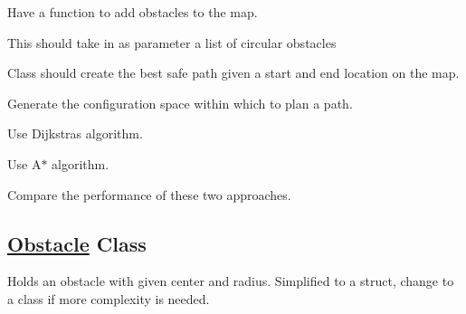 Have a function to add obstacles to the map.
\begin{DoxyItemize}
\item This should take in as parameter a list of circular obstacles
\end{DoxyItemize}

Class should create the best safe path given a start and end location on the map.
\begin{DoxyItemize}
\item Generate the configuration space within which to plan a path.
\item Use Dijkstra\textquotesingle{}s algorithm.
\item Use A$\ast$ algorithm.
\item Compare the performance of these two approaches.
\end{DoxyItemize}

\subsection*{\mbox{\hyperlink{struct_obstacle}{Obstacle}} Class}

Holds an obstacle with given center and radius. Simplified to a struct, change to a class if more complexity is needed. 